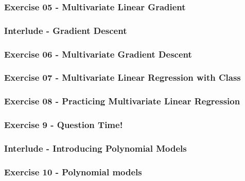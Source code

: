 \documentclass[]{article}
\begin{document}
\hypertarget{exercise-05---multivariate-linear-gradient}{%
\subsubsection{Exercise 05 - Multivariate Linear
Gradient}\label{exercise-05---multivariate-linear-gradient}}

\hypertarget{interlude---gradient-descent}{%
\subsubsection{Interlude - Gradient
Descent}\label{interlude---gradient-descent}}

\hypertarget{exercise-06---multivariate-gradient-descent}{%
\subsubsection{Exercise 06 - Multivariate Gradient
Descent}\label{exercise-06---multivariate-gradient-descent}}

\hypertarget{exercise-07---multivariate-linear-regression-with-class}{%
\subsubsection{Exercise 07 - Multivariate Linear Regression with
Class}\label{exercise-07---multivariate-linear-regression-with-class}}

\hypertarget{exercise-08---practicing-multivariate-linear-regression}{%
\subsubsection{Exercise 08 - Practicing Multivariate Linear
Regression}\label{exercise-08---practicing-multivariate-linear-regression}}

\hypertarget{exercise-9---question-time}{%
\subsubsection{Exercise 9 - Question
Time!}\label{exercise-9---question-time}}

\hypertarget{interlude---introducing-polynomial-models}{%
\subsubsection{Interlude - Introducing Polynomial
Models}\label{interlude---introducing-polynomial-models}}

\hypertarget{exercise-10---polynomial-models}{%
\subsubsection{Exercise 10 - Polynomial
models}\label{exercise-10---polynomial-models}}
\end{document}
